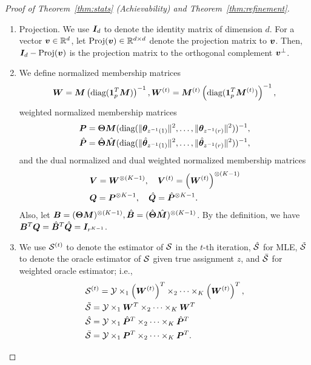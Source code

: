 \documentclass[journal]{IEEEtran}
\theoremstyle{definition}
\theoremstyle{definition}
\newcommand{\of}[1]{\left(#1\right)}
\begin{document}
\begin{proof}[Proof of Theorem~\ref{thm:stats} (Achievability) and Theorem~\ref{thm:refinement}]
{\begin{enumerate}[wide]
\item Projection. We use $\bm I_d$ to denote the identity matrix of dimension $d$. For a vector $\bm{v} \in \mathbb{R}^d$, let $\text{Proj}(\bm{v}) \in \mathbb{R}^{d \times d}$ denote the projection matrix to $\bm{v}$. Then, $\bm I_d - \text{Proj}(\bm{v})$ is the projection matrix to the orthogonal complement $\bm{v}^{\perp}$. 

    \item We define normalized membership matrices
    \small
    \begin{equation}
        \mW = \mM \of{ \text{diag}(\mone_{p}^T \mM) }^{-1}, \mW^{(t)} = \mM^{(t)} \of{ \text{diag}(\mone_{p}^T \mM^{(t)}) }^{-1},
    \end{equation}
    \normalsize
    weighted normalized membership matrices
    \begin{align}
        &\bm{P} = \boldsymbol{\Theta} \bm M ( \text{diag}( \lVert\boldsymbol{\theta}_{z^{-1}(1)}\rVert^2 , \ldots, \lVert\boldsymbol{\theta}_{z^{-1}(r)}\rVert^2 ) )^{-1}, \\
        &\hat {\bm{P}} = \hat {\boldsymbol{\Theta}} \hat {\bm M} ( \text{diag}( \lVert\hat {\boldsymbol{\theta}}_{z^{-1}(1)}\rVert^2 , \ldots, \lVert\hat {\boldsymbol{\theta}}_{z^{-1}(r)}\rVert^2 ) )^{-1},
    \end{align}
    and the dual normalized and dual weighted normalized membership matrices
    \begin{align}
         &\mV = \mW^{\otimes (K-1)}, \quad \mV^{(t)} =\of{ \mW^{(t)}}^{\otimes (K-1)}\\
         &\mQ = \mP^{\otimes K-1}, \quad  \hat \mQ = \hat \mP^{\otimes K-1}.
    \end{align}
    Also, let $\bm B = (\boldsymbol{\Theta} \bm M)^{\otimes (K-1)}, \hat {\bm B} = (\hat {\boldsymbol{\Theta}} \hat {\bm M})^{\otimes (K-1)}$. By the definition, we have $\bm B^T \bm{Q} =\hat {\bm B}^T \hat {\bm{Q}} =\bm I_{r^{K-1}}$.
    \item We use $\mathcal{S}^{(t)}$ to denote the estimator of $\mathcal{S}$ in the $t$-th iteration, $\hat {\mathcal{S}}$ for MLE, $\tilde {\mathcal{S}}$ to denote the oracle estimator of $\mathcal{S}$ given true assignment $z$, and $\bar {\mathcal{S}}$ for weighted oracle estimator; i.e.,
    \begin{align}
        &\tS^{(t)} = \tY \times_1 \of{\mW^{(t)}}^T \times_2 \cdots \times_K \of{\mW^{(t)}}^T,\\ &\tilde \tS = \tY \times_1 \mW^T \times_2 \cdots \times_K \mW^T \\
        &\hat \tS =  \tY \times_1 \hat \mP^T \times_2 \cdots \times_K \hat \mP^T \\
        &\bar \tS  = \tY \times_1 \mP^T \times_2 \cdots \times_K \mP^T.
    \end{align}

\end{enumerate}}
\end{proof}
\end{document}
